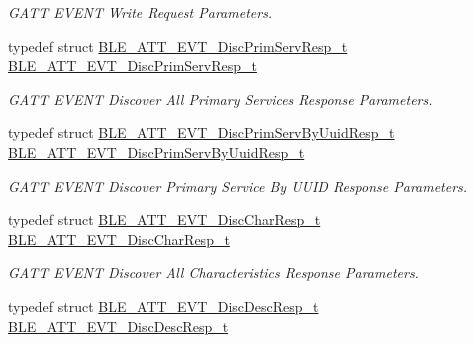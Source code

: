 \begin{DoxyCompactItemize}
\begin{DoxyCompactList}\small\item\em G\+A\+TT E\+V\+E\+NT Write Request Parameters. \end{DoxyCompactList}\item 
typedef struct \hyperlink{struct_b_l_e___a_t_t___e_v_t___disc_prim_serv_resp__t}{B\+L\+E\+\_\+\+A\+T\+T\+\_\+\+E\+V\+T\+\_\+\+Disc\+Prim\+Serv\+Resp\+\_\+t} \hyperlink{group___b_l_e___g_a_t_t_gaefbeb8d6d5cc69f6d81bfb175571fe96}{B\+L\+E\+\_\+\+A\+T\+T\+\_\+\+E\+V\+T\+\_\+\+Disc\+Prim\+Serv\+Resp\+\_\+t}\hypertarget{group___b_l_e___g_a_t_t_gaefbeb8d6d5cc69f6d81bfb175571fe96}{}\label{group___b_l_e___g_a_t_t_gaefbeb8d6d5cc69f6d81bfb175571fe96}

\begin{DoxyCompactList}\small\item\em G\+A\+TT E\+V\+E\+NT Discover All Primary Services Response Parameters. \end{DoxyCompactList}\item 
typedef struct \hyperlink{struct_b_l_e___a_t_t___e_v_t___disc_prim_serv_by_uuid_resp__t}{B\+L\+E\+\_\+\+A\+T\+T\+\_\+\+E\+V\+T\+\_\+\+Disc\+Prim\+Serv\+By\+Uuid\+Resp\+\_\+t} \hyperlink{group___b_l_e___g_a_t_t_gacb3678acf025e0577c09e755c198d2d2}{B\+L\+E\+\_\+\+A\+T\+T\+\_\+\+E\+V\+T\+\_\+\+Disc\+Prim\+Serv\+By\+Uuid\+Resp\+\_\+t}\hypertarget{group___b_l_e___g_a_t_t_gacb3678acf025e0577c09e755c198d2d2}{}\label{group___b_l_e___g_a_t_t_gacb3678acf025e0577c09e755c198d2d2}

\begin{DoxyCompactList}\small\item\em G\+A\+TT E\+V\+E\+NT Discover Primary Service By U\+U\+ID Response Parameters. \end{DoxyCompactList}\item 
typedef struct \hyperlink{struct_b_l_e___a_t_t___e_v_t___disc_char_resp__t}{B\+L\+E\+\_\+\+A\+T\+T\+\_\+\+E\+V\+T\+\_\+\+Disc\+Char\+Resp\+\_\+t} \hyperlink{group___b_l_e___g_a_t_t_gad9e875621693416b47ca45c81b3dafff}{B\+L\+E\+\_\+\+A\+T\+T\+\_\+\+E\+V\+T\+\_\+\+Disc\+Char\+Resp\+\_\+t}\hypertarget{group___b_l_e___g_a_t_t_gad9e875621693416b47ca45c81b3dafff}{}\label{group___b_l_e___g_a_t_t_gad9e875621693416b47ca45c81b3dafff}

\begin{DoxyCompactList}\small\item\em G\+A\+TT E\+V\+E\+NT Discover All Characteristics Response Parameters. \end{DoxyCompactList}\item 
typedef struct \hyperlink{struct_b_l_e___a_t_t___e_v_t___disc_desc_resp__t}{B\+L\+E\+\_\+\+A\+T\+T\+\_\+\+E\+V\+T\+\_\+\+Disc\+Desc\+Resp\+\_\+t} \hyperlink{group___b_l_e___g_a_t_t_ga44940b346b848503bf77c1e1f5d765f4}{B\+L\+E\+\_\+\+A\+T\+T\+\_\+\+E\+V\+T\+\_\+\+Disc\+Desc\+Resp\+\_\+t}\hypertarget{group___b_l_e___g_a_t_t_ga44940b346b848503bf77c1e1f5d765f4}{}\label{group___b_l_e___g_a_t_t_ga44940b346b848503bf77c1e1f5d765f4}


\end{DoxyCompactItemize}
